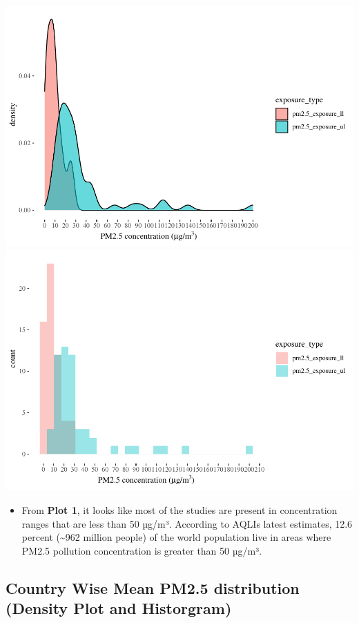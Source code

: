 \documentclass[
]{article}
\providecommand{\tightlist}{%
  \setlength{\itemsep}{0pt}\setlength{\parskip}{0pt}}
\begin{document}
\includegraphics[width=1\linewidth]{man/figures/README-pm2.5_expo_ul_ll-1}
\includegraphics[width=1\linewidth]{man/figures/README-pm2.5_expo_ul_ll-2}

\begin{itemize}
\tightlist
\item
  From \textbf{Plot 1}, it looks like most of the studies are present in
  concentration ranges that are less than 50 µg/m³. According to AQLIs
  latest estimates, 12.6 percent (\textasciitilde962 million people) of
  the world population live in areas where PM2.5 pollution concentration
  is greater than 50 µg/m³.
\end{itemize}

\hypertarget{country-wise-mean-pm2.5-distribution-density-plot-and-historgram}{%
\subsection{Country Wise Mean PM2.5 distribution (Density Plot and
Historgram)}\label{country-wise-mean-pm2.5-distribution-density-plot-and-historgram}}
\end{document}
